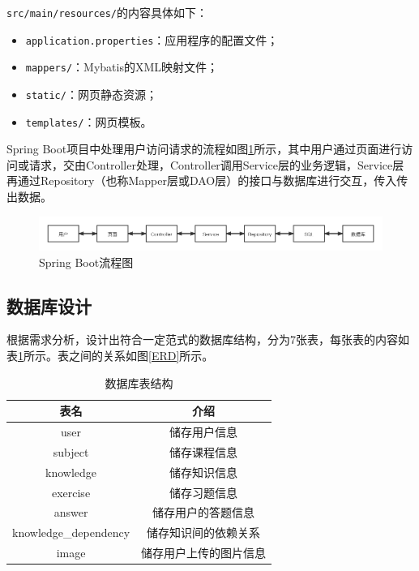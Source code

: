\documentclass{nwafucoursepaper}
\begin{document}
\verb|src/main/resources/|的内容具体如下：
\begin{itemize}
    \item \verb|application.properties|：应用程序的配置文件；
    \item \verb|mappers/|：Mybatis的XML映射文件；
    \item \verb|static/|：网页静态资源；
    \item \verb|templates/|：网页模板。
\end{itemize}

Spring Boot项目中处理用户访问请求的流程如图\ref{Spring Boot流程图}所示，其中用户通过页面进行访问或请求，交由Controller处理，Controller调用Service层的业务逻辑，Service层再通过Repository（也称Mapper层或DAO层）的接口与数据库进行交互，传入传出数据。

\begin{figure}[htp]
  \centering
  \includegraphics[width=\textwidth]{springboot.png}
  \caption{Spring Boot流程图}
  \label{Spring Boot流程图}
\end{figure}

\subsection{数据库设计}

根据需求分析，设计出符合一定范式的数据库结构，分为7张表，每张表的内容如表\ref{tables}所示。表之间的关系如图\ref{ERD}所示。

\begin{table}[htp]
  \centering
  \begin{tabular}{|c|c|}
  \hline
  表名                    & 介绍          \\ \hline
  user                  & 储存用户信息      \\ \hline
  subject               & 储存课程信息      \\ \hline
  knowledge             & 储存知识信息      \\ \hline
  exercise              & 储存习题信息      \\ \hline
  answer                & 储存用户的答题信息   \\ \hline
  knowledge\_dependency & 储存知识间的依赖关系  \\ \hline
  image                 & 储存用户上传的图片信息 \\ \hline
  \end{tabular}
  \caption{数据库表结构}
  \label{tables}
  \end{table}
\end{document}
